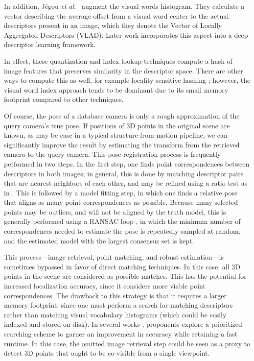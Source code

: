 In addition, J{\'e}gou \textit{et al}.\ \cite{jegou2010aggregating} augment the visual words histogram. They calculate a vector describing the average offset from a visual word center to the actual descriptors present in an image, which they denote the Vector of Locally Aggregated Descriptors (VLAD). Later work \cite{arandjelovic2016netvlad} incorporates this aspect into a deep descriptor learning framework.

In effect, these quantization and index lookup techniques compute a hash of image features that preserves similarity in the descriptor space. There are other ways to compute this as well, for example locality sensitive hashing \cite{datar2004locality}; however, the visual word index approach tends to be dominant due to its small memory footprint compared to other techniques.

Of course, the pose of a database camera is only a rough approximation of the query camera's true pose. If positions of 3D points in the original scene are known, as may be case in a typical structure-from-motion pipeline, we can significantly improve the result by estimating the transform from the retrieved camera to the query camera. This pose registration process is frequently performed in two steps. In the first step, one finds point correspondences between descriptors in both images; in general, this is done by matching descriptor pairs that are nearest neighbors of each other, and may be refined using a ratio test as in \cite{lowe1999object}. This is followed by a model fitting step, in which one finds a relative pose that aligns as many point correspondences as possible. Because many selected points may be outliers, and will not be aligned by the truth model, this is generally performed using a RANSAC loop \cite{fischler1981random}, in which the minimum number of correspondences needed to estimate the pose is repeatedly sampled at random, and the estimated model with the largest consensus set is kept.

This process---image retrieval, point matching, and robust estimation---is sometimes bypassed in favor of direct matching techniques. In this case, all 3D points in the scene are considered as possible matches. This has the potential for increased localization accuracy, since it considers more viable point correspondences. The drawback to this strategy is that it requires a larger memory footprint, since one must perform a search for matching descriptors rather than matching visual vocabulary histograms (which could be easily indexed and stored on disk). In several works \cite{li2010location} \cite{sattler2011fast} \cite{sattler2012image}, proponents explore a prioritized searching scheme to garner an improvement in accuracy while retaining a fast runtime. In this case, the omitted image retrieval step could be seen as a proxy to detect 3D points that ought to be co-visible from a single viewpoint.


